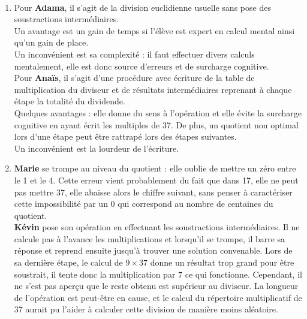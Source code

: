\ \\ [-5mm]
\begin{enumerate}
   \item Pour {\bf Adama}, il s'agit de la division euclidienne usuelle sans pose des soustractions intermédiaires. \\
   Un avantage est un gain de temps si l'élève est expert en calcul mental ainsi qu'un gain de place. \\
   Un inconvénient est sa complexité : il faut effectuer divers calculs mentalement, elle est donc source d'erreurs et de surcharge cognitive. \\
   Pour {\bf Anaïs}, il s'agit d'une procédure avec écriture de la table de multiplication du diviseur et de résultats intermédiaires reprenant à chaque étape la totalité du dividende. \\
   Quelques avantages : elle donne du sens à l'opération et elle évite la surcharge cognitive en ayant écrit les multiples de 37. De plus, un quotient non optimal lors d'une étape peut être rattrapé lors des étapes suivantes. \\
   Un inconvénient est la lourdeur de l'écriture.
   \item {\bf Marie} se trompe au niveau du quotient : elle oublie de mettre un \og zéro \fg{} entre le 1 et le 4. Cette erreur vient probablement du fait que dans 17, elle ne peut pas mettre 37, elle abaisse alors le chiffre suivant, sans penser à caractériser cette impossibilité par un 0 qui correspond au nombre de centaines du quotient. \\
   {\bf Kévin} pose son opération en effectuant les soustractions intermédiaires. Il ne calcule pas à l'avance les multiplications et lorsqu'il se trompe, il barre sa réponse et reprend ensuite jusqu'à trouver une solution convenable. Lors de sa dernière étape, le calcul de $9\times37$ donne un résultat trop grand pour être soustrait, il tente donc la multiplication par 7 ce qui fonctionne. Cependant, il ne s'est pas aperçu que le reste obtenu est  supérieur au diviseur. La longueur de l'opération est peut-être en cause, et le calcul du répertoire multiplicatif de 37 aurait pu l'aider à calculer cette division de manière moins aléatoire.
\end{enumerate}

